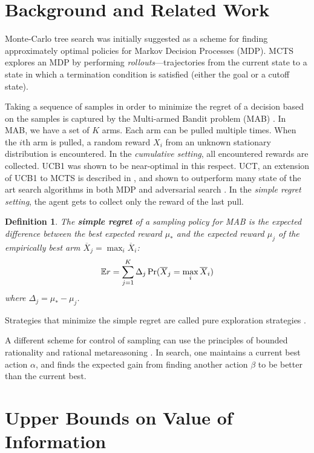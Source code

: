 \documentclass{ecai2012}
\newcommand {\IE} {\ensuremath {\mathbb{E}}}
\newtheorem{dfn}{Definition}
\begin{document}
\section{Background and Related Work}
\label{sec:related-work}

Monte-Carlo tree search was initially suggested as a scheme for
finding approximately optimal policies for Markov Decision Processes
(MDP).  MCTS explores an MDP by performing
\emph{rollouts}---trajectories from the current state to a state in
which a termination condition is satisfied (either the goal or a
cutoff state).

Taking a sequence of samples in order to minimize the regret of a
decision based on the samples is captured by the Multi-armed Bandit
problem (MAB) \cite{Vermorel.bandits}. In MAB, we have a set of $K$
arms. Each arm can be pulled multiple times. When the $i$th arm is
pulled, a random reward $X_i$ from an unknown stationary distribution
is encountered. In the \textit{cumulative setting}, all encountered rewards are
collected.  UCB1 \cite{Auer.ucb} was shown to be
near-optimal in this respect. UCT, an extension of UCB1 to MCTS is
described in \cite{Kocsis.uct}, and shown to outperform many state of
the art search algorithms in both MDP and adversarial search
\cite{Gelly.mogo,Eyerich.ctp}. In the \textit{simple regret setting}, the agent
gets to collect only the reward of the last pull.
\begin{dfn}
The \textbf{simple regret} of a sampling policy for MAB
is the expected difference between the best expected reward
$\mu_*$ and the expected reward $\mu_j$ of the empirically best arm
$\overline X_j=\max_i\overline X_i$:
\begin{equation}
\IE r=\sum_{j=1}^K\Delta_j\Pr(\overline X_j=\max_i\overline X_i)
\label{eqn:simple-regret}
\vspace{-8pt}
\end{equation}
where $\Delta_j=\mu_*-\mu_j$.
\end{dfn}
Strategies that minimize the simple regret are called pure exploration
strategies \cite{Bubeck.pure}. 

A different scheme for control of sampling can use the principles of
bounded rationality \cite{Horvitz.reasoningabout} and rational
metareasoning \cite{Russell.right,HayRussell.MCTS}.  In search, one
maintains a current best action $\alpha$, and finds the expected gain
from finding another action $\beta $ to be better than the current
best.

\section{Upper Bounds on Value of Information}
\end{document}

